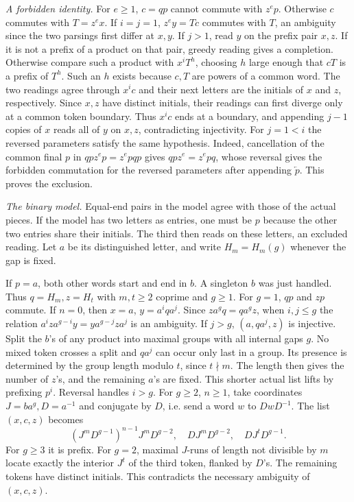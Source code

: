 \documentclass[11pt,a4paper]{article}
\newcommand{\rev}[1]{\overleftarrow{#1}}
\newcommand{\parhead}[1]{\par\smallskip\noindent\textit{#1.}\enspace}
\begin{document}
\parhead{A forbidden identity}
For $e\ge1$, $c=qp$ cannot commute with $z^e p$. Otherwise $c$ commutes with $T=z^e x$. If $i=j=1$, $z^e y=T c$ commutes with $T$, an ambiguity since the two parsings first differ at $x,y$. If $j>1$, read $y$ on the prefix pair $x,z$. If it is not a prefix of a product on that pair, greedy reading gives a completion. Otherwise compare such a product with $x^iT^h$, choosing $h$ large enough that $cT$ is a prefix of $T^h$. Such an $h$ exists because $c,T$ are powers of a common word. The two readings agree through $x^ic$ and their next letters are the initials of $x$ and $z$, respectively. Since $x,z$ have distinct initials, their readings can first diverge only at a common token boundary. Thus $x^ic$ ends at a boundary, and appending $j-1$ copies of $x$ reads all of $y$ on $x,z$, contradicting injectivity. For $j=1<i$ the reversed parameters satisfy the same hypothesis. Indeed, cancellation of the common final $p$ in $qp z^e p=z^e pqp$ gives $qp z^e=z^e pq$, whose reversal gives the forbidden commutation for the reversed parameters after appending $\rev p$. This proves the exclusion.

\parhead{The binary model}
Equal-end pairs in the model agree with those of the actual pieces. If the model has two letters as entries, one must be $p$ because the other two entries share their initials. The third then reads on these letters, an excluded reading. Let $a$ be its distinguished letter, and write $H_m=H_m(g)$ whenever the gap is fixed.

If $p=a$, both other words start and end in $b$. A singleton $b$ was just handled. Thus $q=H_m,z=H_t$ with $m,t\ge2$ coprime and $g\ge1$. For $g=1$, $qp$ and $zp$ commute. If $n=0$, then $x=a$, $y=a^i q a^j$. Since $za^g q=qa^g z$, when $i,j\le g$ the relation $a^i z a^{g-i} y=y a^{g-j}z a^j$ is an ambiguity. If $j>g$, $(a,q a^j,z)$ is injective. Split the $b$'s of any product into maximal groups with all internal gaps $g$. No mixed token crosses a split and $qa^j$ can occur only last in a group. Its presence is determined by the group length modulo $t$, since $t\nmid m$. The length then gives the number of $z$'s, and the remaining $a$'s are fixed. This shorter actual list lifts by prefixing $p^i$. Reversal handles $i>g$.
For $g\ge2$, $n\ge1$, take coordinates $J=ba^g,D=a^{-1}$ and conjugate by $D$, i.e. send a word $w$ to $DwD^{-1}$. The list $(x,c,z)$ becomes
\[
 (J^mD^{g-1})^{n-1}J^mD^{g-2},\quad DJ^mD^{g-2},\quad DJ^tD^{g-1}.
\]
For $g\ge3$ it is prefix. For $g=2$, maximal $J$-runs of length not divisible by $m$ locate exactly the interior $J^t$ of the third token, flanked by $D$'s. The remaining tokens have distinct initials. This contradicts the necessary ambiguity of $(x,c,z)$.
\end{document}
